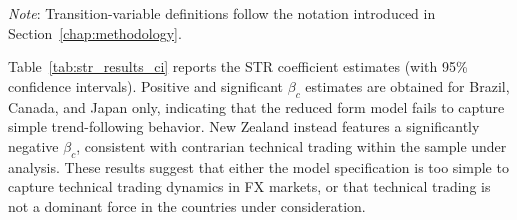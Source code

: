 \documentclass[a4paper,10pt,final]{article}    %
\begin{document}
\begin{table}[htbp]
    \caption{Selected Transition Variables for STR Models (LM Linearity Test)}
    \label{tab:transition_variables}
    \begin{tablenotes}
        \small
        \textit{Note}: Transition-variable definitions follow the notation introduced in Section~\ref{chap:methodology}.
    \end{tablenotes}
\end{table}

Table~\ref{tab:str_results_ci} reports the STR coefficient estimates (with 95\% confidence intervals). Positive and significant $\beta_c$ estimates are obtained for Brazil, Canada, and Japan only, indicating that the reduced form model fails to capture simple trend-following behavior. New Zealand instead features a significantly negative $\beta_c$, consistent with contrarian technical trading within the sample under analysis. These results suggest that either the model specification is too simple to capture technical trading dynamics in FX markets, or that technical trading is not a dominant force in the countries under consideration.
\end{document}
